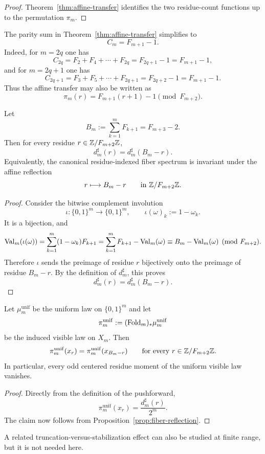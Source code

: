 \begin{proof}
Theorem~\ref{thm:affine-transfer} identifies the two residue-count functions up to the permutation $\pi_m$.
\end{proof}

\begin{remark}
The parity sum in Theorem~\ref{thm:affine-transfer} simplifies to
\[
C_m=F_{m+1}-1.
\]
Indeed, for $m=2q$ one has
\[
C_{2q}=F_2+F_4+\cdots+F_{2q}=F_{2q+1}-1=F_{m+1}-1,
\]
and for $m=2q+1$ one has
\[
C_{2q+1}=F_3+F_5+\cdots+F_{2q+1}=F_{2q+2}-1=F_{m+1}-1.
\]
Thus the affine transfer may also be written as
\[
\pi_m(r)=F_{m+1}(r+1)-1 \pmod{F_{m+2}}.
\]
\end{remark}

\begin{proposition}\label{prop:fiber-reflection}
Let
\[
B_m:=\sum_{k=1}^m F_{k+1}=F_{m+3}-2.
\]
Then for every residue $r\in \mathbb{Z}/F_{m+2}\mathbb{Z}$,
\[
d_m^\sharp(r)=d_m^\sharp(B_m-r).
\]
Equivalently, the canonical residue-indexed fiber spectrum is invariant under the affine reflection
\[
r\longmapsto B_m-r
\qquad\text{in }\mathbb{Z}/F_{m+2}\mathbb{Z}.
\]
\end{proposition}

\begin{proof}
Consider the bitwise complement involution
\[
\iota:\{0,1\}^m\to\{0,1\}^m,\qquad
\iota(\omega)_k:=1-\omega_k.
\]
It is a bijection, and
\[
\mathrm{Val}_m(\iota(\omega))
=
\sum_{k=1}^m (1-\omega_k)F_{k+1}
=
\sum_{k=1}^m F_{k+1}-\mathrm{Val}_m(\omega)
\equiv
B_m-\mathrm{Val}_m(\omega)
\pmod{F_{m+2}}.
\]
Therefore $\iota$ sends the preimage of residue $r$ bijectively onto the preimage of residue $B_m-r$. By the definition of $d_m^\sharp$, this proves
\[
d_m^\sharp(r)=d_m^\sharp(B_m-r).
\]
\end{proof}

\begin{corollary}\label{cor:uniform-visible-symmetry}
Let $\mu_m^{\mathrm{unif}}$ be the uniform law on $\{0,1\}^m$ and let
\[
\pi_m^{\mathrm{unif}}:=(\mathrm{Fold}_m)_*\mu_m^{\mathrm{unif}}
\]
be the induced visible law on $X_m$. Then
\[
\pi_m^{\mathrm{unif}}(x_r)=\pi_m^{\mathrm{unif}}(x_{B_m-r})
\qquad\text{for every }r\in\mathbb{Z}/F_{m+2}\mathbb{Z}.
\]
In particular, every odd centered residue moment of the uniform visible law vanishes.
\end{corollary}

\begin{proof}
Directly from the definition of the pushforward,
\[
\pi_m^{\mathrm{unif}}(x_r)=\frac{d_m^\sharp(r)}{2^m}.
\]
The claim now follows from Proposition~\ref{prop:fiber-reflection}.
\end{proof}

A related truncation-versus-stabilization effect can also be studied at finite range, but it is not needed here.

